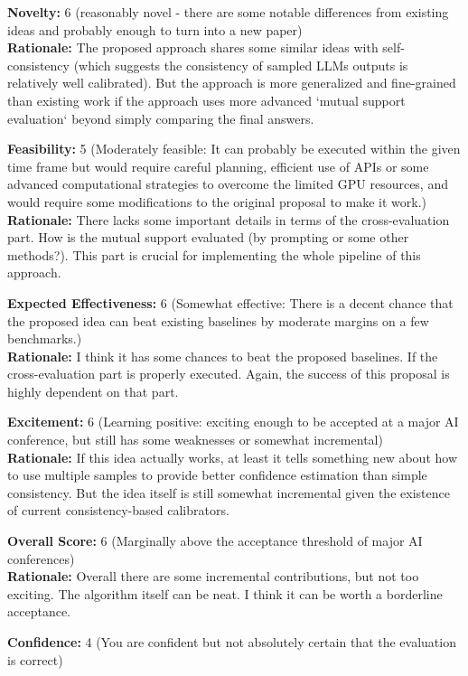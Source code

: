 \begin{tcolorbox}[colback=green!10!white, colframe=green!80!black, title=\textbf{Reviewer 2}]
\small
\textbf{Novelty:} 6 (reasonably novel - there are some notable differences from existing ideas and probably enough to turn into a new paper)\\
\textbf{Rationale:} The proposed approach shares some similar ideas with self-consistency (which suggests the consistency of sampled LLMs outputs is relatively well calibrated). But the approach is more generalized and fine-grained than existing work if the approach uses more advanced `mutual support evaluation` beyond simply comparing the final answers.

\vspace{10pt}

\textbf{Feasibility:} 5 (Moderately feasible: It can probably be executed within the given time frame but would require careful planning, efficient use of APIs or some advanced computational strategies to overcome the limited GPU resources, and would require some modifications to the original proposal to make it work.)\\
\textbf{Rationale:} There lacks some important details in terms of the cross-evaluation part. How is the mutual support evaluated (by prompting or some other methods?). This part is crucial for implementing the whole pipeline of this approach.

\vspace{10pt}

\textbf{Expected Effectiveness:} 6 (Somewhat effective: There is a decent chance that the proposed idea can beat existing baselines by moderate margins on a few benchmarks.)\\
\textbf{Rationale:} I think it has some chances to beat the proposed baselines. If the cross-evaluation part is properly executed. Again, the success of this proposal is highly dependent on that part.

\vspace{10pt}

\textbf{Excitement:} 6 (Learning positive: exciting enough to be accepted at a major AI conference, but still has some weaknesses or somewhat incremental)\\
\textbf{Rationale:} If this idea actually works, at least it tells something new about how to use multiple samples to provide better confidence estimation than simple consistency. But the idea itself is still somewhat incremental given the existence of current consistency-based calibrators.

\vspace{10pt}

\textbf{Overall Score:} 6 (Marginally above the acceptance threshold of major AI conferences)\\
\textbf{Rationale:} Overall there are some incremental contributions, but not too exciting. The algorithm itself can be neat. I think it can be worth a borderline acceptance.

\vspace{10pt}

\textbf{Confidence:} 4 (You are confident but not absolutely certain that the evaluation is correct)
\end{tcolorbox}

